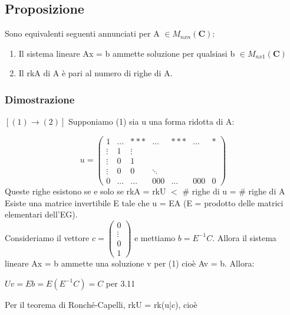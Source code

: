 \documentclass[12pt]{article}
\begin{document}
\subsection{Proposizione}

Sono equivalenti seguenti annunciati per A $\in M_{nxn} (\mathbf{C}):$ \begin{enumerate}
    \item Il sistema lineare Ax = b ammette soluzione per qualsiasi b $\in M_{nx1} (\mathbf{C})$
    \item Il rkA di A è pari al numero di righe di A.
\end{enumerate}

\subsubsection{Dimostrazione}

$[(1) \longrightarrow (2)]$ Supponiamo (1) sia u una forma ridotta di A:

\[u = \begin{pmatrix}
    1 & ... & *** & ... & *** & ... & *\\
    \vdots & 1 & \vdots\\
    \vdots & 0 & 1\\
    \vdots & 0 & 0 & \ddots\\
    0 & ... & ... & 000 & ... & 000 & 0
\end{pmatrix}\]
Queste righe esistono se e solo se rkA = rkU $<$ $\#$ righe di u = $\#$ righe di A\\
Esiste una matrice invertibile E tale che u = EA (E = prodotto delle matrici elementari dell'EG).\\
Consideriamo il vettore $c = \begin{pmatrix}
    0\\
    \vdots\\
    0\\
    1
\end{pmatrix}$ e mettiamo $b = E^{-1}C$. Allora il sistema lineare Ax = b ammette una soluzione v per (1) cioè Av = b. Allora:

\begin{center}$Uv = Eb = E(E^{-1}C) = C$ per 3.11\end{center}
Per il teorema di Ronché-Capelli, rkU = rk(u|c), cioè
\end{document}
